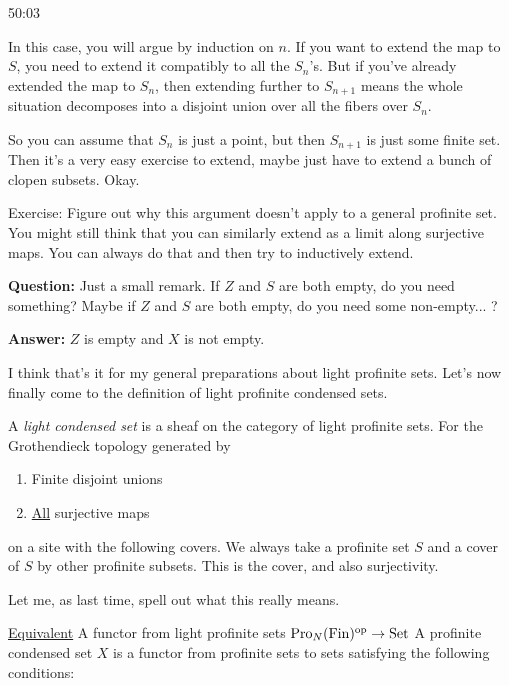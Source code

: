 \begin{example}
\begin{unfinished}{50:03}
\begin{sketch}
In this case, you will argue by induction on $n$. If you want to extend the map to $S$, you need to extend it compatibly to all the $S_n$'s. But if you've already extended the map to $S_n$, then extending further to $S_{n+1}$ means the whole situation decomposes into a disjoint union over all the fibers over $S_n$.

So you can assume that $S_n$ is just a point, but then $S_{n+1}$ is just some finite set. Then it's a very easy exercise to extend, maybe just have to extend a bunch of clopen subsets. Okay.

\end{sketch}

Exercise: Figure out why this argument doesn't apply to a general profinite set. You might still think that you can similarly extend as a limit along surjective maps. You can always do that and then try to inductively extend.

\textbf{Question:} Just a small remark. If $Z$ and $S$ are both empty, do you need something? Maybe if $Z$ and $S$ are both empty, do you need some non-empty... ? 

\textbf{Answer:} $Z$ is empty and $X$ is not empty. 

I think that's it for my general preparations about light profinite sets. Let's now finally come to the definition of light profinite condensed sets.

\begin{definition}

A \emph{light condensed set} is a sheaf on the category of light profinite sets. For the Grothendieck topology generated by 

\begin{enumerate}
\item Finite disjoint unions
\item \underline{All} surjective maps
\end{enumerate} 

\end{definition}

on a site with the following covers. We always take a profinite set $S$ and a cover of $S$ by other profinite subsets. This is the cover, and also surjectivity.

Let me, as last time, spell out what this really means.

\underline{Equivalent} A functor from light profinite sets $\operatorname{Pro}_{N}(\operatorname{Fin})^{\mathrm{op}} \to \mathrm{Set}$
A profinite condensed set $X$ is a functor from profinite sets to sets satisfying the following conditions:


\end{unfinished}
\end{example}
